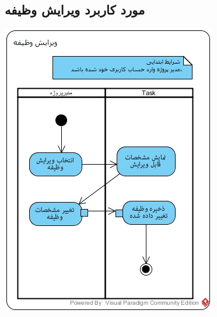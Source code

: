 \subsection*{مورد کاربرد ویرایش وظیفه}
\vspace{2cm}
\begin{center}
\includegraphics[width=\textwidth]{ActivityDiagramsWithSwimlanes/19.jpg}
\end{center}

\newpage
\vspace{2cm}
